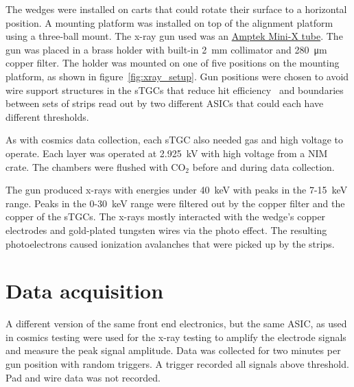 The wedges were installed on carts that could rotate their surface to a horizontal position. A mounting platform was installed on top of the alignment platform using a three-ball mount. The x-ray gun used was an \href{https://www.amptek.com/-/media/ametekamptek/documents/resources/specs/mini-x-specifications.pdf?la=en\&revision=512f7eb3-01b3-47fd-864f-5525c850fc6e\&hash=B8B03C0592486E2D91C566C4326F15F5}{Amptek Mini-X tube}. The gun was placed in a brass holder with built-in \SI{2}{mm} collimator and \SI{280}{\micro\meter} copper filter. The holder was mounted on one of five positions on the mounting platform, as shown in figure~\ref{fig:xray_setup}. Gun positions were chosen to avoid wire support structures in the sTGCs that reduce hit efficiency~\cite{lefebvre_thesis} and boundaries between sets of strips read out by two different ASICs that could each have different thresholds. 

As with cosmics data collection, each sTGC also needed gas and high voltage to operate. Each layer was operated at \SI{2.925}{kV} with high voltage from a NIM crate. The chambers were flushed with CO$_2$ before and during data collection.

The gun produced x-rays with energies under \SI{40}{\kilo\electronvolt} with peaks in the 7-\SI{15}{keV} range. Peaks in the 0-\SI{30}{keV} range were filtered out by the copper filter and the copper of the sTGCs. The x-rays mostly interacted with the wedge's copper electrodes and gold-plated tungsten wires via the photo effect. The resulting photoelectrons caused ionization avalanches that were picked up by the strips.

\section{Data acquisition}

A different version of the same front end electronics, but the same ASIC, as used in cosmics testing were used for the x-ray testing to amplify the electrode signals and measure the peak signal amplitude. Data was collected for two minutes per gun position with random triggers. A trigger recorded all signals above threshold. Pad and wire data was not recorded.

